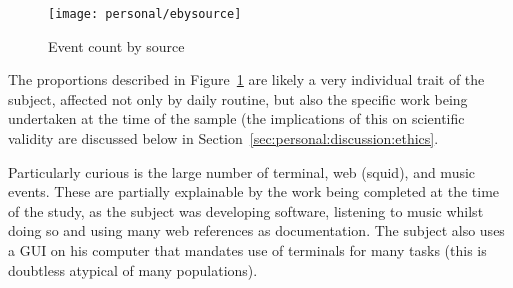 

\begin{figure}[hp]
    \centering
    \texttt{[image: personal/ebysource]}
    \caption{Event count by source}
    \label{fig:personal:eventsbysource}
\end{figure}

The proportions described in Figure~\ref{fig:personal:eventsbysource} are likely a very individual trait of the subject, affected not only by daily routine, but also the specific work being undertaken at the time of the sample (the implications of this on scientific validity are discussed below in Section~\ref{sec:personal:discussion:ethics}.

Particularly curious is the large number of terminal, web (squid), and music events.  These are partially explainable by the work being completed at the time of the study, as the subject was developing software, listening to music whilst doing so and using many web references as documentation.  The subject also uses a GUI on his computer that mandates use of terminals for many tasks (this is doubtless atypical of many populations).



